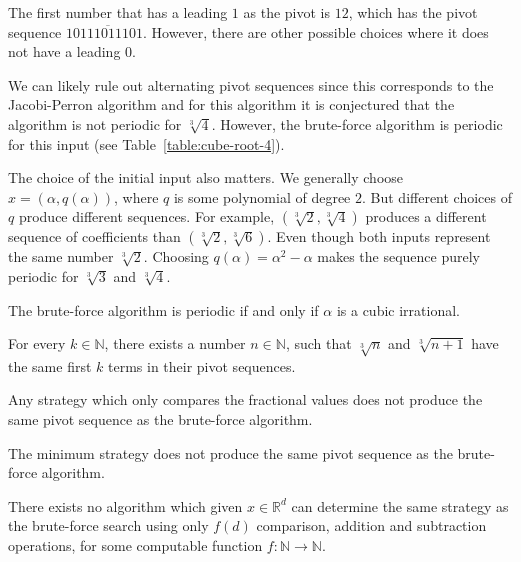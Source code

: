 \begin{remark}
  The first number that has a leading $1$ as the pivot is $12$,
  which has the pivot sequence $1\overline{0111011101}$.
  However, there are other possible choices where it does not have a leading $0$.
\end{remark}

We can likely rule out alternating pivot sequences since this corresponds to
the Jacobi-Perron algorithm and for this algorithm it is conjectured
\cite{Karpenkov2024} that the algorithm is not periodic for $\sqrt[3]{4}$.
However, the brute-force algorithm is periodic for this input (see Table~\ref{table:cube-root-4}).

The choice of the initial input also matters.
We generally choose $x = (α, q(α))$, where $q$ is some polynomial of degree $2$.
But different choices of $q$ produce different sequences.
For example, $(\sqrt[3]{2}, \sqrt[3]{4})$ produces a different sequence of coefficients than $(\sqrt[3]{2}, \sqrt[3]{6})$.
Even though both inputs represent the same number $\sqrt[3]{2}$.
Choosing $q(α) = α^2 - α$ makes the sequence purely periodic for $\sqrt[3]{3}$ and $\sqrt[3]{4}$.

\begin{conjecture}
  The brute-force algorithm is periodic if and only if $α$ is a cubic irrational.
\end{conjecture}

\begin{lemma}
  \label{lem:consecutive-same}
  For every $k ∈ ℕ$, there exists a number $n ∈ ℕ$,
  such that $\sqrt[3]{n}$ and $\sqrt[3]{n + 1}$ have the same first $k$ terms in
  their pivot sequences.
\end{lemma}

\begin{corollary}
  Any strategy which only compares the fractional values does not produce the
  same pivot sequence as the brute-force algorithm.
\end{corollary}

\begin{corollary}
  The minimum strategy does not produce the same pivot sequence as the
  brute-force algorithm.
\end{corollary}

\iffalse
\begin{theorem}
  There exists no algorithm which given $x ∈ ℝ^d$ can determine the same
  strategy as the brute-force search using only $f(d)$ comparison, addition
  and subtraction operations, for some computable function $f \colon ℕ → ℕ$.
\end{theorem}

